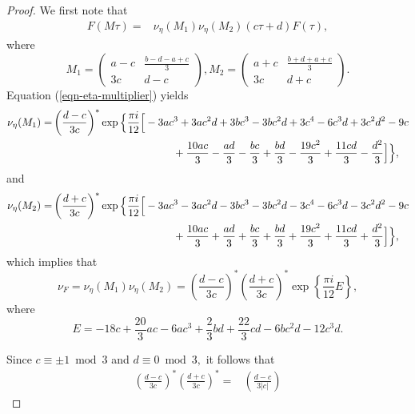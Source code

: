 \documentclass[12pt]{article}
\theoremstyle{definition}
\numberwithin{equation}{section}
\numberwithin{theorem}{section}
\begin{document}
\begin{proof}
We first note that 
\begin{align*}
F(M\tau)=&
\nu_{\eta}(M_1) \nu_{\eta} (M_2)
(c\tau+d)F(\tau),
\end{align*}
where 
\begin{equation*}
M_1
=
\begin{pmatrix}
a-c & \frac{ b-d-a+c }{3} \\
3c & d-c
\end{pmatrix}, 
M_2
=
\begin{pmatrix}
a+c & \frac{ b+d+a+c }{3} \\
3c & d+c
\end{pmatrix}. 
\end{equation*}
Equation (\ref{eqn-eta-multiplier})
yields 
\begin{align*}
\nu_{\eta}(M_1)=&
\left(
\frac{d-c}{3c}
\right)^{*}  
\exp
\Big\{
\frac{\pi i}{12}
\Big[
-3 a c^3+3 a c^2 d+3 b c^3-3 b c^2 d+3 c^4-6 c^3 d+3 c^2 d^2 -9 c\\ 
&
\hspace{40mm}
+\frac{10 a c}{3}-\frac{a d}{3}-\frac{b c}{3}+\frac{b d}{3}-\frac{19 c^2}{3}+\frac{11 c d}{3}-\frac{d^2}{3}
\Big]
\Big\},
\end{align*}
and 
\begin{align*}
\nu_{\eta}(M_2)=&
\left(
\frac{d+c}{3c}
\right)^{*}  
\exp 
\Big\{
\frac{\pi i}{12}
\Big[
-3 a c^3-3 a c^2 d-3 b c^3-3 b c^2 d-3 c^4-6 c^3 d-3 c^2 d^2-9 c \\
&\hspace{40mm}
+\frac{10 a c}{3}+\frac{a d}{3}
+\frac{b c}{3}+\frac{b d}{3}+\frac{19 c^2}{3}+\frac{11 c d}{3}+\frac{d^2}{3}
\Big]
\Big\},
\end{align*}
which implies that 
\begin{equation*}
\nu_{F}
=
\nu_{\eta}(M_1) \nu_{\eta} (M_2)
=
\left(
\frac{d-c}{3c}
\right)^{*}  
\left(
\frac{d+c}{3c}
\right)^{*}  
\exp
\left\{
\frac{\pi i}{12}
E
\right\}, 
\end{equation*}
where 
\begin{equation*}
E=
-18 c + \frac{20}{3} a c - 6 a c^3 + \frac23 b d + \frac{22}{3} c d - 6 b c^2 d - 
 12 c^3 d. 
\end{equation*}
\par
Since $c\equiv \pm1 \bmod{3}$ and $d\equiv0 \bmod{3},$ it follows that 
\begin{align*}
\left(
\frac{d-c}{3c}
\right)^{*}  
\left(
\frac{d+c}{3c}
\right)^{*}  
=&
\left(
\frac{d-c}{3 |c|}
\right) 

\end{align*}
\end{proof}
\end{document}
